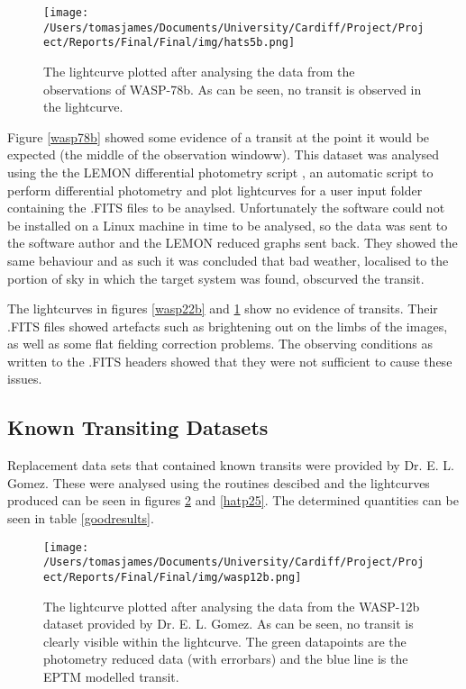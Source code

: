 \documentclass{report}
\begin{document}
\begin{figure}[H]
\centering
    \texttt{[image: /Users/tomasjames/Documents/University/Cardiff/Project/Project/Reports/Final/Final/img/hats5b.png]}
\caption{The lightcurve plotted after analysing the data from the observations of WASP-78b. As can be seen, no transit is observed in the lightcurve.} \label{hats5b}
\end{figure}

Figure \ref{wasp78b} showed some evidence of a transit at the point it would be expected (the middle of the observation windoww). This dataset was analysed using the the LEMON differential photometry script \parencite{lemon}, an automatic script to perform differential photometry and plot lightcurves for a user input folder containing the .FITS files to be anaylsed. Unfortunately the software could not be installed on a Linux machine in time to be analysed, so the data was sent to the software author and the LEMON reduced graphs sent back. They showed the same behaviour and as such it was concluded that bad weather, localised to the portion of sky in which the target system was found, obscurved the transit. 

The lightcurves in figures \ref{wasp22b} and \ref{hats5b} show no evidence of transits. Their .FITS files showed artefacts such as brightening out on the limbs of the images, as well as some flat fielding correction problems. The observing conditions as written to the .FITS headers showed that they were not sufficient to cause these issues. 

\subsection{Known Transiting Datasets}
Replacement data sets that contained known transits were provided by Dr. E. L. Gomez. These were analysed using the routines descibed and the lightcurves produced can be seen in figures \ref{wasp12b} and \ref{hatp25}. The determined quantities can be seen in table \ref{goodresults}.

\begin{figure}[H]
\centering
    \texttt{[image: /Users/tomasjames/Documents/University/Cardiff/Project/Project/Reports/Final/Final/img/wasp12b.png]}
\caption{The lightcurve plotted after analysing the data from the WASP-12b dataset provided by Dr. E. L. Gomez. As can be seen, no transit is clearly visible within the lightcurve. The green datapoints are the photometry reduced data (with errorbars) and the blue line is the EPTM modelled transit.} \label{wasp12b}
\end{figure}
\end{document}
